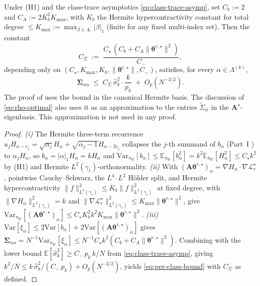 \documentclass[review,hidelinks,onefignum,onetabnum]{siamart251216}
\newcommand{\EE}{\mathbb{E}}
\newcommand{\Var}{\mathrm{Var}}
\newcommand{\gauss}{\gamma}
\newcommand{\mA}{\bm{A}}
\newcommand{\vU}{\bm{U}}
\newcommand{\scL}{\mathcal{L}}
\begin{document}
\begin{corollary}
\label{cor:per-class-cov-bound}
Under (H1) and the class-trace asymptotics \eqref{eq:class-trace-asymp}, set $C_b := 2$ and $C_A := 2K_b^2 K_{\max}$, with $K_b$ the Hermite hypercontractivity constant \cite{Janson1997gaussian} for total degree $\le K_{\max} := \max_{\beta\in\Lambda_r}|\beta|_1$ (finite for any fixed multi-index set). Then the constant
\begin{equation}
  C_\Sigma \;:=\; \frac{C_\star\,(C_b + C_A\|\bm\theta^{r,\star}\|^2)}{C_-},
  \label{eq:CSigma-def}
\end{equation}
depending only on $(C_\star, K_{\max}, K_b, \|\bm\theta^{r,\star}\|, C_-)$, satisfies, for every $\alpha\in\Lambda^{(k)}$,
\begin{equation}
  \bm\Sigma_{\alpha\alpha}
  \;\le\;
  C_\Sigma\,\widehat\sigma_k^2 \cdot \frac{k}{p_k}
  \;+\;
  O_p(N^{-3/2}).
  \label{eq:per-class-bound}
\end{equation}
The proof of  uses the bound in the canonical Hermite basis. The discussion of \eqref{eq:rho-optimal} also uses it as an approximation to the entries $\widetilde\Sigma_{ii}$ in the $\mA^\star$-eigenbasis. This approximation is not used in any proof.
\end{corollary}

\begin{proof}
\emph{(i)} The Hermite three-term recurrence $u_j H_{\alpha-e_j} = \sqrt{\alpha_j}H_\alpha + \sqrt{\alpha_j-1}H_{\alpha-2e_j}$ collapses the $j$-th summand of $b_\alpha$ (Part~I \cite{CAS_partI}) to $\alpha_j H_\alpha$, so $b_\alpha = |\alpha|_1 H_\alpha = k H_\alpha$ and $\Var_{\pi_{\vU}}[b_\alpha] \le \EE_{\pi_{\vU}}[b_\alpha^2] = k^2\EE_{\pi_{\vU}}[H_\alpha^2] \le C_\star k^2$ by (H1) and Hermite $L^2(\gauss_r)$-orthonormality. \emph{(ii)} With $(\mathbf A\bm\theta^{r,\star})_\alpha = \nabla H_\alpha\cdot\nabla\scL_r^\star$, pointwise Cauchy--Schwarz, the $L^4$--$L^2$ Hölder split, and Hermite hypercontractivity $\|f\|^2_{L^4(\gauss_r)} \le K_b\|f\|^2_{L^2(\gauss_r)}$ at fixed degree, with $\|\nabla H_\alpha\|^2_{L^2(\gauss_r)} = k$ and $\|\nabla\scL_r^\star\|^2_{L^2(\gauss_r)} \le K_{\max}\|\bm\theta^{r,\star}\|^2$, give $\Var_{\pi_{\vU}}[(\mathbf A\bm\theta^{r,\star})_\alpha] \le C_\star K_b^2 k^2 K_{\max}\|\bm\theta^{r,\star}\|^2$. \emph{(iii)} $\Var[\xi_\alpha] \le 2\Var[b_\alpha] + 2\Var[(\mathbf A\bm\theta^{r,\star})_\alpha]$ gives $\bm\Sigma_{\alpha\alpha} = N^{-1}\Var_{\pi_{\vU}}[\xi_\alpha] \le N^{-1}C_\star k^2(C_b + C_A\|\bm\theta^{r,\star}\|^2)$. Combining with the lower bound $\EE[\widehat\sigma_k^2] \ge C_-\,p_k\,k/N$ from \eqref{eq:class-trace-asymp}, giving $k^2/N \le k\,\widehat\sigma_k^2/(C_-\,p_k) + O_p(N^{-3/2})$, yields \eqref{eq:per-class-bound} with $C_\Sigma$ as defined.
\end{proof}
\end{document}
